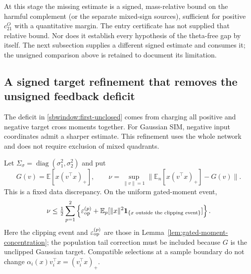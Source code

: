 \documentclass{article} %
\theoremstyle{plain}
\theoremstyle{definition}
\theoremstyle{remark}
\begin{document}
At this stage the missing estimate is a signed, mass-relative bound on
the harmful complement (or the separate mixed-sign sources), sufficient
for positive $c_{21}^O$ with a quantitative margin. The entry certificate
has not supplied that relative bound. Nor does it establish every
hypothesis of the theta-free gap by itself. The next subsection supplies a different signed estimate and consumes it;
the unsigned comparison above is retained to document its limitation.

\subsection{A signed target refinement that removes the unsigned feedback deficit}

The deficit in \eqref{sbwindow:first-unclosed} comes from charging all
positive and negative target cross moments together. For Gaussian SIM,
negative input coordinates admit a sharper estimate. This refinement
uses the whole network and does not require exclusion of mixed quadrants.

Let $\Sigma_\sigma=\operatorname{diag}(\sigma_1^2,\sigma_2^2)$ and put
\[
 G(v)=\mathbb E[x(v^\top x)_+],\qquad
 \nu=\sup_{\|v\|=1}\|\mathbb E_n[x(v^\top x)_+]-G(v)\|.
\]
This is a fixed data discrepancy. On the uniform gated-moment event,
\[
 \nu\le\tfrac12\sum_{p=1}^2\left\{
 \varepsilon_{\rm op}^{(p)}+
 \mathbb E_p[\|x\|^2\mathbf1_{\{x\text{ outside the clipping event}\}}]
 \right\}.
\]
Here the clipping event and $\varepsilon_{\rm op}^{(p)}$ are those in
Lemma~\ref{lem:gated-moment-concentration}; the population tail correction
must be included because $G$ is the unclipped Gaussian target.
Compatible selections at a sample boundary do not change
$\alpha_i(x)v_i^\top x=(v_i^\top x)_+$.
\end{document}
